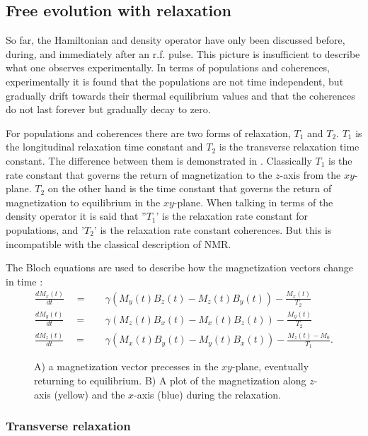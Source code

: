 \subsection{Free evolution with relaxation}\label{Relaxation}

So far, the Hamiltonian and density operator have only been discussed before, during, and
immediately after an r.f. pulse. This picture is insufficient to describe what one observes
experimentally. In terms of populations and coherences, experimentally it is found that
the populations are not time independent, but gradually drift towards their thermal
equilibrium values and that the coherences do not last forever but gradually decay
to zero.

For populations and coherences there are two forms of relaxation, $T_1$ and $T_2$. $T_1$ is the longitudinal relaxation time
constant and $T_2$ is the transverse relaxation time constant. The difference between them is demonstrated in . Classically
$T_1$ is the rate constant that governs the return of magnetization to the $z$-axis from the $xy$-plane. $T_2$ on
the other hand is the time constant that governs the return of magnetization to equilibrium in the $xy$-plane.
When talking in terms of the density operator it is said that ''$T_1$' is the relaxation rate constant for populations, and '$T_2$' is the relaxation
rate constant coherences. But this is incompatible with the classical description of NMR.

The Bloch equations are used to describe how the magnetization vectors change in time \citep{Bloch:1946hk}:
\begin{align}
  \frac{dM_x(t)}{dt}\quad=&\quad\gamma(M_y(t)B_z(t)-M_z(t)B_y(t)) - \frac{M_x(t)}{T_2}\\
  \frac{dM_y(t)}{dt}\quad=&\quad\gamma(M_z(t)B_x(t)-M_x(t)B_z(t)) - \frac{M_y(t)}{T_2}\\
  \frac{dM_z(t)}{dt}\quad=&\quad\gamma(M_x(t)B_y(t)-M_y(t)B_x(t)) - \frac{M_z(t)-M_0}{T_1}.
\end{align}

\begin{figure}[ht]
  \caption{A) a magnetization vector precesses in the $xy$-plane, eventually returning to equilibrium.
  B) A plot of the magnetization along $z$-axis (yellow) and the $x$-axis (blue) during the relaxation.}
  \label{fig:t1t2}
\end{figure}

\subsubsection{Transverse relaxation}\label{T2}

